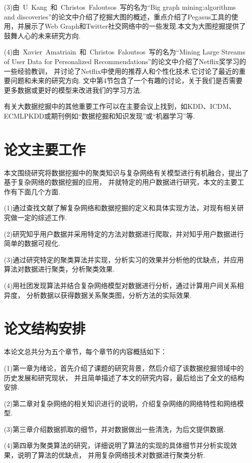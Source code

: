 \documentclass[bachelor,adobefonts]{jnuthesis}
\begin{document}
(3)由\ U\ Kang\ 和\ Christos\ Faloutsos\ 写的名为“Big graph mining:algorithms and discoveries”\cite{Kang2013Big}的论文中介绍了挖掘大图的概述，重点介绍了Pegasus工具的使用，并展示了Web Graph和Twitter社交网络中的一些发现.本文为大图挖掘提供了鼓舞人心的未来研究方向.

(4)由\ Xavier\ Amatriain\ 和\ Christos\ Faloutsos\ 写的名为“Mining Large Streams of User Data for Personalized
Recommendations”\cite{Amatriain2013Mining}的论文中介绍了Netflix奖学习的一些经验教训，
并讨论了Netflix中使用的推荐人和个性化技术.它讨论了最近的重要问题和未来的研究方向.
文中第4节包含了一个有趣的讨论，关于我们是否需要更多数据或更好的模型来改进我们的学习方法.

有关大数据挖掘中的其他重要工作可以在主要会议上找到，如KDD、ICDM、ECMLPKDD或期刊例如“数据挖掘和知识发现”或“机器学习”等.

\section{论文主要工作}
本文围绕研究将数据挖掘中的聚类知识与复杂网络有关模型进行有机融合，提出了基于复杂网络的数据挖掘的应用，
并就特定的用户数据进行研究，本文的主要工作有下面几个方面.

(1)通过查找文献了解复杂网络和数据挖掘的定义和具体实现方法，对现有相关研究做一定的综述工作.

(2)研究知乎用户数据并采用特定的方法对数据进行爬取，并对知乎用户数据进行简单的数据可视化.

(3)通过研究特定的聚类算法并实现，分析实习的效果并分析他的优缺点，并应用算法对数据进行聚类，分析聚类效果.

(4)用社团发现算法并结合复杂网络模型对数据进行分析，通过计算用户间关系相异度， 分析数据以获得数据关系聚类图，分析方法的实际效果.

\section{论文结构安排}
本论文总共分为五个章节，每个章节的内容概括如下：

(1)第一章为绪论，首先介绍了课题的研究背景，然后介绍了该数据挖掘领域中的历史发展和研究现状，
并且简单描述了本文的研究内容，最后给出了全文的结构安排.

(2)第二章对复杂网络的相关知识进行的说明，介绍复杂网络的网络特性和网络模型.

(3)第三章介绍数据抓取的细节，并对数据做出一些清洗，为后文提供数据.

(4)第四章为聚类算法的研究，详细说明了算法的实现的具体细节并分析实现效果，说明了算法的优缺点，
并用复杂网络技术对数据进行聚类分析.
\end{document}
